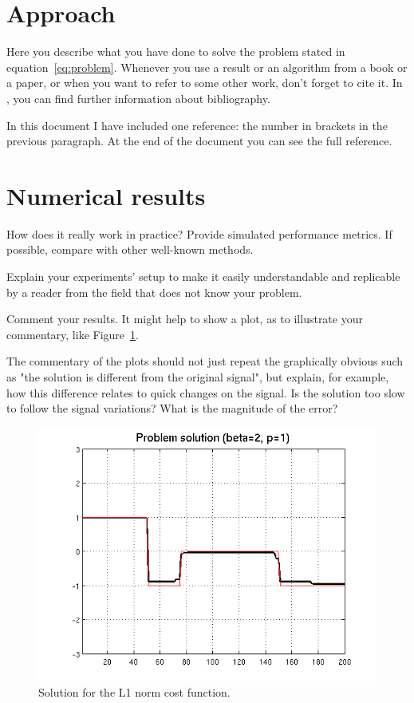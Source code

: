 \documentclass[a4paper]{IEEEtran}
\begin{document}
\section{Approach}
\label{sec:approach}

Here you describe what you have done to solve the problem stated in
equation~\eqref{eq:problem}. Whenever you use a result or an algorithm
from a book or a paper, or when you want to refer to some other work,
don't forget to cite it. In \cite{Oetiker11}, you can find further
information about bibliography.

In this document I have included one reference: the number in brackets
in the previous paragraph. At the end of the document you can see the
full reference.

\section{Numerical results}
\label{sec:numerical-results}

How does it really work in practice? Provide simulated performance
metrics. If possible, compare with other well-known methods.

Explain your experiments' setup to make it easily understandable and
replicable by a reader from the field that does not know your problem.

Comment your results. It might help to show a plot, as to illustrate
your commentary, like Figure~\ref{fig:solution-l1}.


The commentary of the plots should not just repeat the graphically
obvious such as "the solution is different from the original signal",
but explain, for example, how this difference relates to quick changes
on the signal. Is the solution too slow to follow the signal
variations? What is the magnitude of the error?

\begin{figure}[htp]
  \centering
  \includegraphics[width=0.9\columnwidth]{./solution1}
  \caption{Solution for the L1 norm cost function.}
  \label{fig:solution-l1}
\end{figure}
\end{document}
